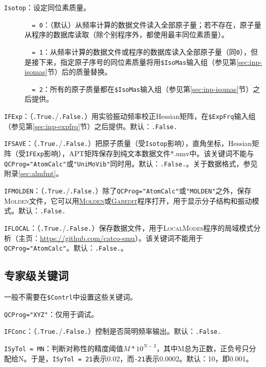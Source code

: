 \documentclass[12pt,a4paper,openany,twoside,cap]{ctexbook}
\begin{document}
\bigskip{}
\verb|Isotop|：设定同位素质量。
\begin{description}
\item[ ]\verb|  = 0|：（默认）从频率计算的数据文件读入全部原子量；若不存在，原子量从程序的数据库读取（除个别程序外，都使用最丰同位素质量）。
\item[ ]\verb|  = 1|：从频率计算的数据文件或程序的数据库读入全部原子量（同\verb|0|），但是接下来，指定原子序号的同位素质量将用\verb|$IsoMas|输入组（参见第\ref{sec:inp-isomas}节）后的质量替换。
\item[ ]\verb|  = 2|：所有的原子质量都在\verb|$IsoMas|输入组（参见第\ref{sec:inp-isomas}节）之后提供。
\end{description}

\bigskip{}
\verb|IFExp|：（\verb|.True.|/\verb|.False.|）用实验振动频率校正Hessian矩阵，在\verb|$ExpFrq|输入组（参见第\ref{sec:inp-expfrq}节）之后提供。默认：\verb|.False.|

\bigskip{}
\verb|IFSAVE|：（\verb|.True.|/\verb|.False.|）把原子质量（受\verb|Isotop|影响），直角坐标，Hessian矩阵（受\verb|IFExp|影响），APT矩阵保存到纯文本数据文件*.umv中。该关键词不能与\verb|QCProg="AtomCalc"|或\verb|"UniMoVib"|同时用。默认：\verb|.False.|。关于数据格式，参见附录\ref{sec:almfmt}。

\bigskip{}
\verb|IFMOLDEN|：（\verb|.True.|/\verb|.False.|）除了\verb|QCProg="AtomCalc"|或\verb|"MOLDEN"|之外，保存\textsc{Molden}文件，它可以用\href{http://www.cmbi.ru.nl/molden/molden.html}{\textsc{Molden}}或\href{http://gabedit.sourceforge.net/}{\textsc{Gabedit}}程序打开，用于显示分子结构和振动模式。默认：\verb|.False.|

\bigskip{}
\verb|IFLOCAL|：（\verb|.True.|/\verb|.False.|）保存数据文件，用于\textsc{LocalModes}程序的局域模式分析（主页：\href{https://github.com/catco-smu}{https://github.com/catco-smu}）。该关键词不能用于
\verb|QCProg="AtomCalc"|。默认：\verb|.False.|。

\subsection{专家级关键词} \label{subsec:inp-qcdata-expert}

一般不需要在\texttt{\$Contrl}中设置这些关键词。

\bigskip{}
\verb|QCProg="XYZ"|：仅用于调试。

\bigskip{}
\verb|IFConc|：（\verb|.True.|/\verb|.False.|）控制是否简明频率输出。默认：\verb|.False.|

\bigskip{}
\verb|ISyTol = MN|：判断对称性的精度阈值$M*10^{N-3}$，其中M总为正数，正负号只分配给N。于是，\verb|ISyTol = 21|表示0.02，而\verb|-21|表示0.0002。默认：10，即0.001。
\end{document}

